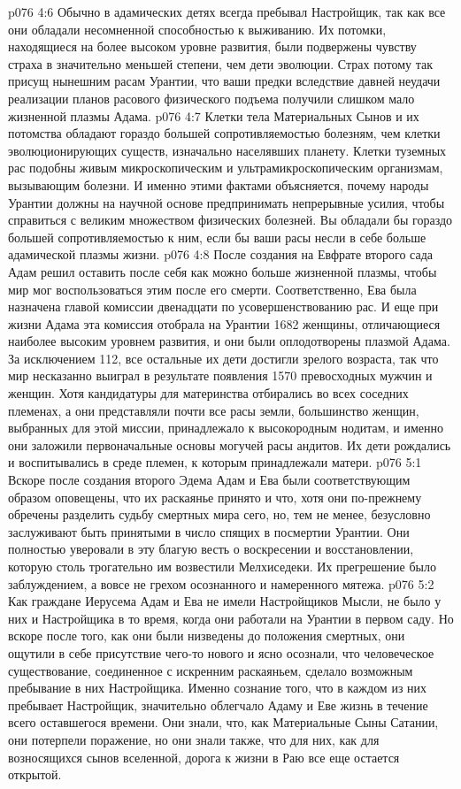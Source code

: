 \vs p076 4:6 Обычно в адамических детях всегда пребывал Настройщик, так как все они обладали несомненной способностью к выживанию. Их потомки, находящиеся на более высоком уровне развития, были подвержены чувству страха в значительно меньшей степени, чем дети эволюции. Страх потому так присущ нынешним расам Урантии, что ваши предки вследствие давней неудачи реализации планов расового физического подъема получили слишком мало жизненной плазмы Адама.
\vs p076 4:7 Клетки тела Материальных Сынов и их потомства обладают гораздо большей сопротивляемостью болезням, чем клетки эволюционирующих существ, изначально населявших планету. Клетки туземных рас подобны живым микроскопическим и ультрамикроскопическим организмам, вызывающим болезни. И именно этими фактами объясняется, почему народы Урантии должны на научной основе предпринимать непрерывные усилия, чтобы справиться с великим множеством физических болезней. Вы обладали бы гораздо большей сопротивляемостью к ним, если бы ваши расы несли в себе больше адамической плазмы жизни.
\vs p076 4:8 \pc После создания на Евфрате второго сада Адам решил оставить после себя как можно больше жизненной плазмы, чтобы мир мог воспользоваться этим после его смерти. Соответственно, Ева была назначена главой комиссии двенадцати по усовершенствованию рас. И еще при жизни Адама эта комиссия отобрала на Урантии 1682 женщины, отличающиеся наиболее высоким уровнем развития, и они были оплодотворены плазмой Адама. За исключением 112, все остальные их дети достигли зрелого возраста, так что мир несказанно выиграл в результате появления 1570 превосходных мужчин и женщин. Хотя кандидатуры для материнства отбирались во всех соседних племенах, а они представляли почти все расы земли, большинство женщин, выбранных для этой миссии, принадлежало к высокородным нодитам, и именно они заложили первоначальные основы могучей расы андитов. Их дети рождались и воспитывались в среде племен, к которым принадлежали матери.
\vs p076 5:1 Вскоре после создания второго Эдема Адам и Ева были соответствующим образом оповещены, что их раскаянье принято и что, хотя они по\hyp{}прежнему обречены разделить судьбу смертных мира сего, но, тем не менее, безусловно заслуживают быть принятыми в число спящих в посмертии Урантии. Они полностью уверовали в эту благую весть о воскресении и восстановлении, которую столь трогательно им возвестили Мелхиседеки. Их прегрешение было заблуждением, а вовсе не грехом осознанного и намеренного мятежа.
\vs p076 5:2 Как граждане Иерусема Адам и Ева не имели Настройщиков Мысли, не было у них и Настройщика в то время, когда они работали на Урантии в первом саду. Но вскоре после того, как они были низведены до положения смертных, они ощутили в себе присутствие чего\hyp{}то нового и ясно осознали, что человеческое существование, соединенное с искренним раскаяньем, сделало возможным пребывание в них Настройщика. Именно сознание того, что в каждом из них пребывает Настройщик, значительно облегчало Адаму и Еве жизнь в течение всего оставшегося времени. Они знали, что, как Материальные Сыны Сатании, они потерпели поражение, но они знали также, что для них, как для возносящихся сынов вселенной, дорога к жизни в Раю все еще остается открытой.
